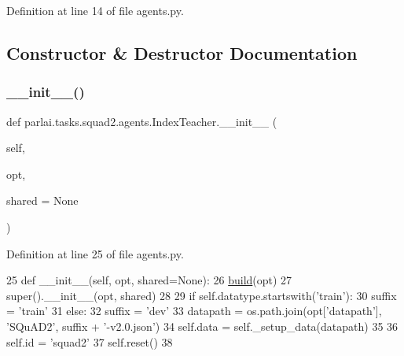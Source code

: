 Definition at line 14 of file agents.\+py.



\subsection{Constructor \& Destructor Documentation}
\mbox{\label{classparlai_1_1tasks_1_1squad2_1_1agents_1_1IndexTeacher_a11e053a7da91de71216a538505257ae2}} 
\subsubsection{\texorpdfstring{\+\_\+\+\_\+init\+\_\+\+\_\+()}{\_\_init\_\_()}}
{\footnotesize\ttfamily def parlai.\+tasks.\+squad2.\+agents.\+Index\+Teacher.\+\_\+\+\_\+init\+\_\+\+\_\+ (\begin{DoxyParamCaption}\item[{}]{self,  }\item[{}]{opt,  }\item[{}]{shared = {\ttfamily None} }\end{DoxyParamCaption})}



Definition at line 25 of file agents.\+py.


\begin{DoxyCode}
25     \textcolor{keyword}{def }\_\_init\_\_(self, opt, shared=None):
26         \hyperlink{namespaceparlai_1_1mturk_1_1tasks_1_1talkthewalk_1_1download_a8c0fbb9b6dfe127cb8c1bd6e7c4e33fd}{build}(opt)
27         super().\_\_init\_\_(opt, shared)
28 
29         \textcolor{keywordflow}{if} self.datatype.startswith(\textcolor{stringliteral}{'train'}):
30             suffix = \textcolor{stringliteral}{'train'}
31         \textcolor{keywordflow}{else}:
32             suffix = \textcolor{stringliteral}{'dev'}
33         datapath = os.path.join(opt[\textcolor{stringliteral}{'datapath'}], \textcolor{stringliteral}{'SQuAD2'}, suffix + \textcolor{stringliteral}{'-v2.0.json'})
34         self.data = self.\_setup\_data(datapath)
35 
36         self.id = \textcolor{stringliteral}{'squad2'}
37         self.reset()
38 
\end{DoxyCode}


